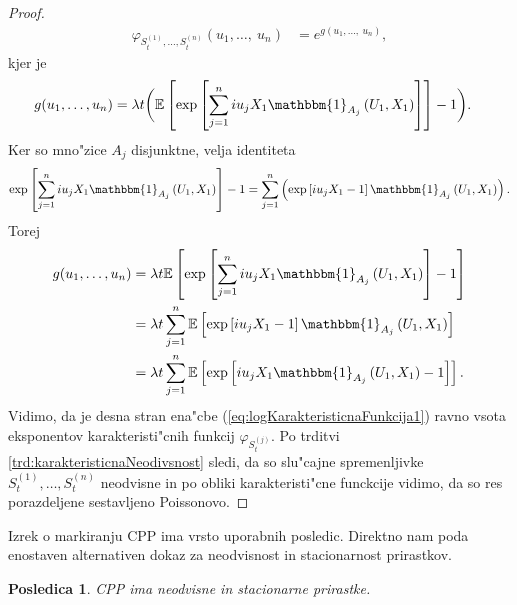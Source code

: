\documentclass[12pt, a4paper, reqno]{amsart}
\theoremstyle{definition}
\theoremstyle{plain}
\newtheorem{posledica}[definicija]{Posledica}
\newcommand{\E}{\mathbb{E}}
\newcommand{\1}{\mathds{1}}
\newcommand*{\refPriloga}[1]{%
  \begingroup
    \hypersetup{
      linkcolor=red,
      linkbordercolor=red,
    }%
    \ref{#1}%
  \endgroup
}
\begin{document}
\begin{proof}
            \begin{align*}
                    \varphi_{S_t^{(1)},\dots, S_t^{(n)}}(u_1, \dots, \ u_n) &= e^{g(u_1, \dots, \ u_n)},
            \end{align*}
            kjer je
            \begin{align}
                    g(u_1, \dots, u_n) &= \lambda t \biggl(\E\left[\exp\left[\sum_{j = 1}^niu_jX_1\mathbbm{1}_{A_j}\left(U_1, X_1\right)\right]\right] - 1\biggr). \label{eq:logKarakteristicnaFunkcija1}
            \end{align}
            Ker so mno"zice $A_j$ disjunktne, velja identiteta
            \begin{equation*}
                \exp\left[\sum_{j = 1}^niu_jX_1\mathbbm{1}_{A_j}\left(U_1, X_1\right)\right] - 1 
                = \sum_{j=1}^n\left(\exp\left[iu_jX_1 - 1\right]\mathbbm{1}_{A_j}\left(U_1, X_1\right)\right).
            \end{equation*}
            Torej 
            \begin{align*}
                g(u_1, \dots, u_n) &=
                \lambda t\E\left[\exp\left[\sum_{j = 1}^niu_jX_1\mathbbm{1}_{A_j}\left(U_1, X_1\right)\right] - 1 \right] \\
                &= \lambda t\sum_{j=1}^n\E\left[\exp\left[iu_jX_1 - 1\right]\mathbbm{1}_{A_j}\left(U_1, X_1\right)\right] \\
                &= \lambda t\sum_{j=1}^n\E\left[\exp\left[iu_jX_1\mathbbm{1}_{A_j}\left(U_1, X_1\right) - 1\right]\right].
            \end{align*}
            Vidimo, da je desna stran ena"cbe (\ref{eq:logKarakteristicnaFunkcija1}) ravno vsota 
            eksponentov karakteristi"cnih funkcij $\varphi_{S_t^{(j)}}$. 
            Po trditvi \refPriloga{trd:karakteristicnaNeodivsnost} sledi, da so slu"cajne 
            spremenljivke $S_t^{(1)}, \dots, S_t^{(n)}$ neodvisne 
            in po obliki karakteristi"cne 
            funckcije vidimo, da so res porazdeljene sestavljeno Poissonovo.
        \end{proof}

        Izrek o markiranju CPP ima vrsto uporabnih posledic. Direktno nam poda enostaven
        alternativen dokaz za neodvisnost in stacionarnost prirastkov.

        \begin{posledica}
            CPP ima neodvisne in stacionarne prirastke.
        \end{posledica}
\end{document}
